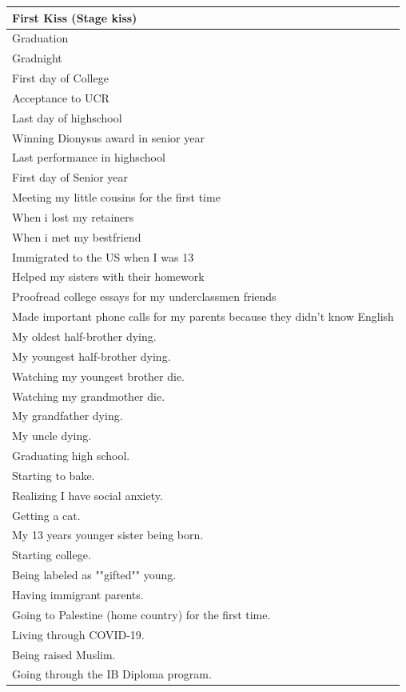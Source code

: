 \documentclass[
  .7em,
  letterpaper,
  DIV=11,
  numbers=noendperiod]{scrartcl}
\begin{document}
\begin{table}
\begin{tabular}{l}
\hline
First Kiss (Stage kiss)\\
\hline
Graduation\\
\hline
Gradnight\\
\hline
First day of College\\
\hline
Acceptance to UCR\\
\hline
Last day of highschool\\
\hline
Winning Dionysus award in senior year\\
\hline
Last performance in highschool\\
\hline
First day of Senior year\\
\hline
Meeting my little cousins for the first time\\
\hline
When i lost my retainers\\
\hline
When i met my bestfriend\\
\hline
Immigrated to the US when I was 13\\
\hline
Helped my sisters with their homework\\
\hline
Proofread college essays for my underclassmen friends\\
\hline
Made important phone calls for my parents because they didn't know English\\
\hline
My oldest half-brother dying.\\
\hline
My youngest half-brother dying.\\
\hline
Watching my youngest brother die.\\
\hline
Watching my grandmother die.\\
\hline
My grandfather dying.\\
\hline
My uncle dying.\\
\hline
Graduating high school.\\
\hline
Starting to bake.\\
\hline
Realizing I have social anxiety.\\
\hline
Getting a cat.\\
\hline
My 13 years younger sister being born.\\
\hline
Starting college.\\
\hline
Being labeled as ""gifted"" young.\\
\hline
Having immigrant parents.\\
\hline
Going to Palestine (home country) for the first time.\\
\hline
Living through COVID-19.\\
\hline
Being raised Muslim.\\
\hline
Going through the IB Diploma program.\\

\end{tabular}
\end{table}
\end{document}
